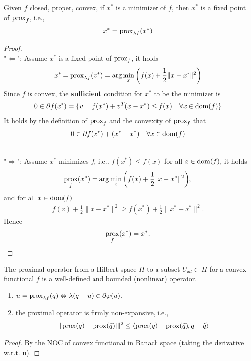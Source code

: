 \begin{theorem}
	Given $f$ closed, proper, convex, if $x^*$ is a minimizer of $f$, then $x^*$ is a fixed point of $\operatorname*{prox}_f$, i.e., 
	\begin{align*}
		x^* = \operatorname*{prox}\nolimits_{\lambda f}(x^*)
	\end{align*}
\end{theorem}
\begin{proof}
\quad\\
"$\Leftarrow$": Assume $x^*$ is a fixed point of $\operatorname*{prox}_f$, it holds
\begin{align*}
	x^* = \operatorname*{prox}\nolimits_{\lambda f}(x^*) = \arg\min_x \bigg( f(x) + \frac{1}{2}\|x - x^*\|^2 \bigg)
\end{align*}
Since $f$ is convex, the \textbf{sufficient} condition for $x^*$ to be the minimizer is 
\begin{align*}
	0 \in \partial f(x^*) = \{ v |\quad f(x^*) + v^T(x - x^*) \le f(x) \quad\forall x \in \operatorname{dom} (f) \}
\end{align*}
It holds by the definition of $\operatorname*{prox}_f$ and the convexity of $\operatorname*{prox}_f$ that
\begin{align*}
	0 \in \partial f(x^*) + (x^* - x^*) \quad \forall x \in \operatorname{dom} (f)
\end{align*}

\quad\\
	"$\Rightarrow$": Assume $x^*$ minimizes $f$, i.e., $f(x^*) \le f(x)$ for all $x \in \operatorname{dom}(f)$, it holds
	\begin{align*}
		\operatorname*{prox}_f(x^*) = \arg\min_x \bigg( f(x) + \frac{1}{2} \|x - x^*\|^2 \bigg),
	\end{align*}
	and for all $x \in \operatorname{dom}(f)$
	\begin{align*}
		f(x) + \frac{1}{2}\|x - x^*\|^2 \ge f(x^*) + \frac{1}{2}\|x^* - x^*\|^2.
	\end{align*}
	Hence 
	\begin{align*}
		\operatorname*{prox}_f(x^*) = x^*. 
	\end{align*}
\end{proof}

\begin{theorem}
    The proximal operator from a Hilbert space $H$ to a subset $U_{ad} \subset H$ for a convex functional $f$ is a well-defined and bounded (nonlinear) operator. 
	\begin{enumerate}
		\item $u = \operatorname*{prox}\nolimits_{\lambda f}(q) \Leftrightarrow \lambda(q - u) \in \partial\varphi(u)$. 
        \item the proximal operator is firmly non-expansive, i.e., 
        $$
           \| \operatorname*{prox} (q) - \operatorname*{prox}(\tilde{q})|\|^2 \le \langle \operatorname*{prox} (q) - \operatorname*{prox}(\tilde{q}), q - \tilde{q}\rangle
        $$
	\end{enumerate}
\end{theorem}
\begin{proof}
    By the NOC of convex functional in Banach space (taking the derivative w.r.t. u). 
\end{proof}


